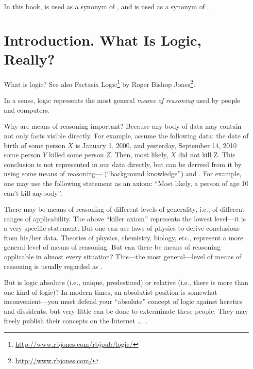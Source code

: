 \begin{remark}[]
In this book,  is used as a synonym of , and  is used as a synonym of .
\end{remark}

\section{Introduction. What Is Logic, Really?}

What is logic?
See also Factasia Logic\footnote{\url{http://www.rbjones.com/rbjpub/logic/}} by Roger Bishop Jones\footnote{\url{http://www.rbjones.com/}}.

In a sense, logic represents the most general \emph{means of reasoning} used by people and computers.

Why are means of reasoning important?
Because any body of data may contain not only facts visible directly.
For example, assume the following data: the date of birth of some person \(X\) is January 1, 2000,
and yesterday, September 14, 2010 some person \(Y\) killed some person \(Z\).
Then, most likely, \(X\) did not kill Z.
This conclusion is not represented in our data directly, but can be derived from it by using some means of reasoning--- (``background knowledge'') and .
For example, one may use the following statement as an axiom: ``Most likely, a person of age 10 can't kill anybody''.

There may be means of reasoning of different levels of generality, i.e., of different ranges of applicability.
The above ``killer axiom'' represents the lowest level---it is a very specific statement.
But one can use laws of physics to derive conclusions from his/her data.
Theories of physics, chemistry, biology, etc., represent a more general level of means of reasoning.
But can there be means of reasoning applicable in almost every situation?
This---the most general---level of means of reasoning is usually regarded as .

But is logic absolute (i.e., unique, predestined) or relative (i.e., there is more than one kind of logic)?
In modern times, an absolutist position is somewhat inconvenient---you must defend your ``absolute'' concept of logic against heretics and dissidents, but very little can be done to exterminate these people.
They may freely publish their concepts on the Internet \ldots~.


